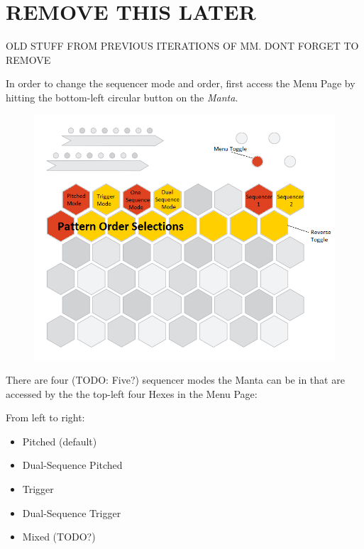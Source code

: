 \renewcommand{\chaptername}{Section}
\chapter{REMOVE THIS LATER}

OLD STUFF FROM PREVIOUS ITERATIONS OF MM. DONT FORGET TO REMOVE

  In order to change the sequencer mode and order, first access the Menu Page
  by hitting the bottom-left circular button on the \emph{Manta}.

  \begin{figure}[h!]
    \includegraphics[width=\linewidth]{menu.png}
  \end{figure}

  There are four (TODO: Five?) sequencer modes the Manta can be in that are accessed by the
  the top-left four Hexes in the Menu Page:

  From left to right:
  \begin{itemize}
    \item Pitched (default)
    \item Dual-Sequence Pitched
    \item Trigger
    \item Dual-Sequence Trigger
    \item Mixed (TODO?)
  \end{itemize}

